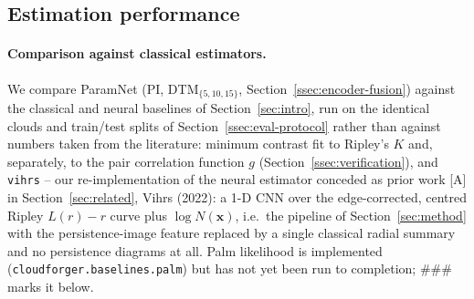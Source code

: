 \documentclass[11pt,letterpaper]{article}
\newcommand{\1}{\mathds{1}}
\newcommand{\pc}{\mathbf{x}}
\theoremstyle{plain}
\theoremstyle{definitioncolon}
\begin{document}
\subsection{Estimation performance}
\label{ssec:exp-performance}

\paragraph{Comparison against classical estimators.}
We compare ParamNet (PI, DTM$_{\{5,10,15\}}$, Section~\ref{ssec:encoder-fusion})
against the classical and neural baselines of Section~\ref{sec:intro}, run on
the identical clouds and train/test splits of Section~\ref{ssec:eval-protocol}
rather than against numbers taken from the literature: minimum contrast fit to
Ripley's $K$ and, separately, to the pair correlation function $g$
(Section~\ref{ssec:verification}), and \texttt{vihrs} -- our re-implementation
of the neural estimator conceded as prior work [A] in Section~\ref{sec:related},
Vihrs (2022): a 1-D CNN over the edge-corrected, centred Ripley $L(r)-r$ curve
plus $\log N(\pc)$, i.e.\ the pipeline of Section~\ref{sec:method} with the
persistence-image feature replaced by a single classical radial summary and no
persistence diagrams at all. Palm likelihood \citep{tanaka2008parameter} is
implemented (\texttt{cloudforger.baselines.palm}) but has not yet been run to
completion; \#\#\# marks it below.
\end{document}
